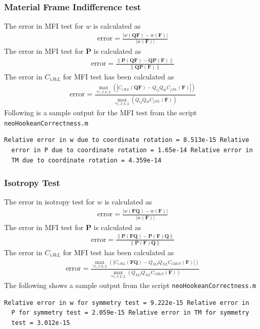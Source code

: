\message{ !name(p1_2.tex)}\documentclass[../main.tex]{subfiles}
\begin{document}
\subsubsection{Material Frame Indifference test}
The error in MFI test for $w$ is calculated as
\begin{align*}
  \text{error} = \frac{|w(\mathbf{QF}) - w(\mathbf{F})|}{|w(\mathbf{F})|}
\end{align*}
The error in MFI test for $\mathbf{P}$ is calculated as
\begin{align*}
  \text{error} = \frac{\lVert\mathbf{P}(\mathbf{Q}\mathbf{F}) -\mathbf{Q}\mathbf{P}(\mathbf{F})\rVert}{\lVert\mathbf{Q}\mathbf{P}(\mathbf{F})\rVert}
\end{align*}
The error in $C_{iJkL}$ for MFI test has been calculated as
\begin{align*}
  \text{error} =\frac{\underset{\forall i,J,k,L}{\max}\left(|C_{iJkL}(\mathbf{Q}\mathbf{F})-Q_{ij}Q_{kl}C_{jJlL}(\mathbf{F})|\right)}{\underset{\forall i,J,k,L}{\max}\left(Q_{ij}Q_{kl}C_{jJlL}(\mathbf{F})\right)}
\end{align*}
Following is a sample output for the MFI test from the script
\texttt{neoHookeanCorrectness.m}
\begin{lstlisting}[frame=single]
  Relative error in w due to coordinate rotation = 8.513e-15 Relative
  error in P due to coordinate rotation = 1.65e-14 Relative error in
  TM due to coordinate rotation = 4.359e-14
\end{lstlisting}

\subsubsection{Isotropy Test}
The error in isotropy test for $w$ is calculated as
\begin{align*}
  \text{error} = \frac{|w(\mathbf{FQ}) - w(\mathbf{F})|}{|w(\mathbf{F})|}
\end{align*}
The error in MFI test for $\mathbf{P}$ is calculated as
\begin{align*}
  \text{error} = \frac{\lVert\mathbf{P}(\mathbf{F}\mathbf{Q}) -\mathbf{P}(\mathbf{F})\mathbf{Q}\rVert}{\lVert\mathbf{P}(\mathbf{F})\mathbf{Q}\rVert}
\end{align*}
The error in $C_{iJkL}$ for MFI test has been calculated as
\begin{align*}
  \text{error} =\frac{\underset{\forall i,J,k,L}{\max}\left(|C_{iJkL}(\mathbf{F}\mathbf{Q})-Q_{MJ}Q_{NL}C_{iMkN}(\mathbf{F})|\right)}{\underset{\forall i,J,k,L}{\max}\left(Q_{MJ}Q_{NL}C_{iMkN}(\mathbf{F})\right)}
\end{align*}
The following shows a sample output from the script
\texttt{neoHookeanCorrectness.m}
\begin{lstlisting}[frame=single]
  Relative error in w for symmetry test = 9.222e-15 Relative error in
  P for symmetry test = 2.059e-15 Relative error in TM for symmetry
  test = 3.012e-15
\end{lstlisting}
\end{document}
